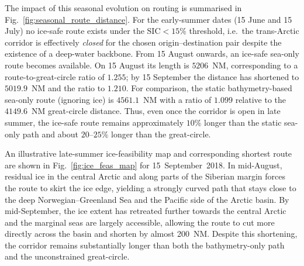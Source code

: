\begin{table}[htbp]
  \centering
  \caption{Seasonal evolution of ice-safe sea area and route availability for the
  canonical trans-Arctic origin--destination pair under the $\mathrm{SIC}<15\%$
  criterion. Ice-safe fractions are expressed relative to the static sea mask.
  ``Route'' indicates whether a continuous ice-safe path exists.}
  \label{tab:seasonal_ice_metrics}
\end{table}

The impact of this seasonal evolution on routing is summarised in
Fig.~\ref{fig:seasonal_route_distance}. For the early-summer dates (15 June and
15 July) no ice-safe route exists under the $\mathrm{SIC}<15\%$ threshold, i.e.\
the trans-Arctic corridor is effectively \emph{closed} for the chosen
origin--destination pair despite the existence of a deep-water backbone. From
15 August onwards, an ice-safe sea-only route becomes available. On 15 August
its length is $5206$~NM, corresponding to a route-to-great-circle ratio of
$1.255$; by 15 September the distance has shortened to $5019.9$~NM and the
ratio to $1.210$. For comparison, the static bathymetry-based sea-only route
(ignoring ice) is $4561.1$~NM with a ratio of $1.099$ relative to the
$4149.6$~NM great-circle distance. Thus, even once the corridor is open in
late summer, the ice-safe route remains approximately $10\%$ longer than the
static sea-only path and about $20$--$25\%$ longer than the great-circle.

An illustrative late-summer ice-feasibility map and corresponding shortest
route are shown in Fig.~\ref{fig:ice_feas_map} for
15~September~2018. In mid-August, residual ice in the central Arctic and
along parts of the Siberian margin forces the route to skirt the ice edge,
yielding a strongly curved path that stays close to the deep
Norwegian--Greenland Sea and the Pacific side of the Arctic basin. By
mid-September, the ice extent has retreated further towards the central
Arctic and the marginal seas are largely accessible, allowing the route to
cut more directly across the basin and shorten by almost 200~NM. Despite
this shortening, the corridor remains substantially longer than both the
bathymetry-only path and the unconstrained great-circle.

